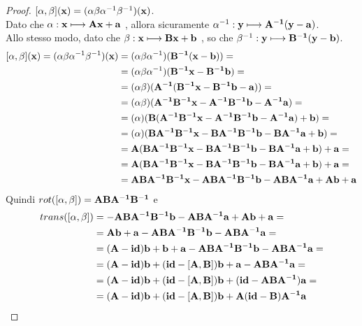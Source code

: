 \documentclass[12pt,a4paper]{book}
\begin{document}
\begin{proof}
	$ [ \alpha, \beta ](\vb{x}) = ( \alpha \beta \alpha^{-1} \beta^{-1} ) (\vb{x})$. \\
	Dato che $ \alpha : \vb{x} \longmapsto \vb{Ax + a}$ , allora sicuramente  $\alpha^{-1}: \vb{y} \longmapsto \vb{A^{-1}(y-a)}$.  \\
	Allo stesso modo, dato che $ \beta : \vb{x} \longmapsto \vb{Bx + b}$ , so che $\beta^{-1}: \vb{y} \longmapsto \vb{B^{-1}(y-b)}$. 
\begin{equation*}
\begin{split}
[ \alpha, \beta ](\vb{x}) = (\alpha \beta \alpha^{-1} \beta^{-1} ) (\vb{x})
& = (\alpha \beta \alpha^{-1})( \vb{B^{-1}(x-b)}) = \\ 
& = (\alpha \beta \alpha^{-1})( \vb{B^{-1}x- B^{-1}b }) = \\ 
& = (\alpha \beta)(\vb{A^{-1}( B^{-1}x- B^{-1}b -a)})= \\
& =  (\alpha \beta)(\vb{A^{-1} B^{-1}x- A^{-1}B^{-1}b -A^{-1}a})  = \\
& = (\alpha)(\vb{B(A^{-1} B^{-1}x- A^{-1}B^{-1}b -A^{-1}a) +b}) = \\
& = (\alpha)(\vb{BA^{-1} B^{-1}x-BA^{-1}B^{-1}b -BA^{-1}a +b}) = \\
& = \vb{A(BA^{-1} B^{-1}x-BA^{-1}B^{-1}b -BA^{-1}a +b) + a} = \\
& = \vb{A(BA^{-1} B^{-1}x-BA^{-1}B^{-1}b -BA^{-1}a +b) + a} = \\
& = \vb{ABA^{-1} B^{-1}x-ABA^{-1}B^{-1}b -ABA^{-1}a +Ab + a }
\end{split}
\end{equation*}
Quindi $ rot([ \alpha , \beta ]) = \vb{ABA^{-1} B^{-1} }$ e
\begin{equation*}
\begin{split}
trans([ \alpha, \beta ]) & = \vb{-ABA^{-1}B^{-1}b -ABA^{-1}a +Ab + a }= \\
& = \vb{Ab + a -ABA^{-1}B^{-1}b -ABA^{-1}a }= \\
& = \vb{(A-id)b + b + a -ABA^{-1}B^{-1}b -ABA^{-1}a} = \\
& = \vb{(A-id)b + (id-[A,B])b + a - ABA^{-1}a} = \\
& = \vb{(A-id)b + (id-[A,B])b + (id- ABA^{-1})a }= \\
& = \vb{(A-id)b + (id-[A,B])b + A(id- B)A^{-1}a} 
\end{split}
\end{equation*}	
\end{proof}
\end{document}
